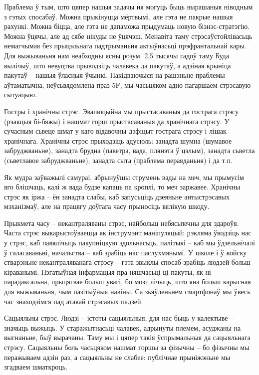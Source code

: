 Праблема ў тым, што цяпер нашыя задачы ня могуць быць вырашаныя ніводным з гэтых спосабаў. Можна прыкінуцца мёртвымі, але гэта не пакрые нашыя рахункі. Можна біцца, але гэта не дапаможа прыдумаць новую бізнэс-стратэгію. Можна ўцячы, але ад сябе нікуды не ўцячэш. Менавіта таму стрэсаўстойлівасьць немагчымая без прыцэльнага падтрыманьня актыўнасьці прэфрантальнай кары. Для выжываньня нам неабходны ясны розум. 2,5 тысячы гадоў таму Буда вылічыў, што невуцтва прыводзіць чалавека да пакутаў, а адзіная крыніца пакутаў – нашыя ўласныя ўчынкі. Накідваючыся на рашэньне праблемы аўтаматычна, неўсьвядомлена праз 5F, мы часьцяком адно пагаршаем стрэсавую сытуацыю.

Гостры і хранічны стрэс. Эвалюцыйна мы прыстасаваныя да гострага стрэсу (рэакцыя бі-бяжы) і нашмат горш прыстасаваныя да хранічнага стрэсу. У сучасным сьвеце шмат у каго відавочны дэфіцыт гострага стрэсу і лішак хранічнага. Хранічны стрэс прыходзіць адусюль: занадта шумна (шумавое забруджваньне), занадта брудна (паветра, вада, плянэта ў цэлым), занадта сьветла (сьветлавое забруджваньне), занадта сыта (праблема пераяданьня) і да т.п.

Як мудра заўважылі самураі, абрынуўшы струмень вады на меч, мы прымусім яго блішчаць, калі ж вада будзе капаць па кроплі, то меч заржавее. Хранічны стрэс як іржа – ён занадта слабы, каб запусьціць дзеяньне антыстрэсавых мэханізмаў, але на працягу доўгага часу прыносіць вялікую шкоду.

Прыкмета часу – некантраляваны стрэс, найбольш небясьпечны для здароўя. Часта стрэс выкарыстоўваецца як інструмэнт маніпуляцый: рэкляма ўводзіць нас у стрэс, каб павялічыць пакупніцкую здольнасьць, палітыкі – каб мы ўдзельнічалі ў галасаваньні, начальства – каб зрабіць нас паслухмянымі. У школе і ў войску стварэньне некантраляванага стрэсу – гэта звыклы спосаб зрабіць людзей больш кіраванымі. Нэгатыўная інфармацыя пра няшчасьці ці пакуты, як ні парадаксальна, прыцягвае больш увагі, бо мозг лічыць, што яна больш карысная для выжываньня, чым пазітыўныя навіны. Са зьяўленьнем смартфонаў мы ўвесь час знаходзімся пад атакай стрэсавых падзей.

Сацыяльны стрэс. Людзі – істоты сацыяльныя, для нас быць у калектыве – значыць выжыць. У старажытнасьці чалавек, адрынуты племем, асуджаны на выгнаньне, быў вырачаны. Таму мы і цяпер такія ўспрымальныя да сацыяльнага стрэсу. Сацыяльны боль часьцяком нашмат горшы за фізычны – бо фізычны мы перажываем адзін раз, а сацыяльны не слабее: публічнае прыніжэньне мы згадваем шматкроць.

